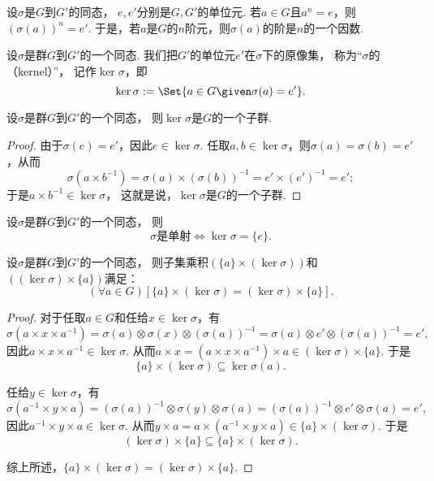 \begin{property}
设\(\sigma\)是\(G\)到\(G'\)的同态，
\(e,e'\)分别是\(G,G'\)的单位元.
若\(a \in G\)且\(a^n = e\)，则\((\sigma(a))^n = e'\).
于是，若\(a\)是\(G\)的\(n\)阶元，则\(\sigma(a)\)的阶是\(n\)的一个因数.
\end{property}

\begin{definition}
设\(\sigma\)是群\(G\)到\(G'\)的一个同态.
我们把\(G'\)的单位元\(e'\)在\(\sigma\)下的原像集，
称为“\(\sigma\)的（kernel）”，
记作\(\ker\sigma\)，即\[
	\ker\sigma \defeq \Set{ a \in G \given \sigma(a) = e' }.
\]
\end{definition}

\begin{proposition}
设\(\sigma\)是群\(G\)到\(G'\)的一个同态，
则\(\ker\sigma\)是\(G\)的一个子群.
\begin{proof}
由于\(\sigma(e)=e'\)，因此\(e\in\ker\sigma\).
任取\(a,b\in\ker\sigma\)，则\(\sigma(a)=\sigma(b)=e'\)，从而\[
	\sigma(a \times b^{-1}) = \sigma(a) \times (\sigma(b))^{-1}
	= e' \times (e')^{-1}
	= e';
\]
于是\(a \times b^{-1} \in \ker\sigma\)，
这就是说，\(\ker\sigma\)是\(G\)的一个子群.
\end{proof}
\end{proposition}

\begin{proposition}
设\(\sigma\)是群\(G\)到\(G'\)的一个同态，
则\[
	\text{\(\sigma\)是单射}
	\iff
	\ker\sigma=\{e\}.
\]
\end{proposition}

\begin{proposition}
设\(\sigma\)是群\(G\)到\(G'\)的一个同态，
则子集乘积\((\{a\}\times(\ker\sigma))\)和\(((\ker\sigma)\times\{a\})\)满足：
\[
	(\forall a \in G)[\{a\}\times(\ker\sigma)=(\ker\sigma)\times\{a\}].
\]
\begin{proof}
对于任取\(a\in G\)和任给\(x\in\ker\sigma\)，有\[
	\sigma(a \times x \times a^{-1})
	= \sigma(a) \otimes \sigma(x) \otimes (\sigma(a))^{-1}
	= \sigma(a) \otimes e' \otimes (\sigma(a))^{-1}
	= e',
\]
因此\(a \times x \times a^{-1} \in \ker\sigma\).
从而\(a \times x
= (a \times x \times a^{-1}) \times a \in (\ker\sigma)\times\{a\}\).
于是\[
	\{a\}\times(\ker\sigma) \subseteq \ker\sigma(a).
\]

任给\(y\in\ker\sigma\)，有\[
	\sigma(a^{-1} \times y \times a)
	= (\sigma(a))^{-1} \otimes \sigma(y) \otimes \sigma(a)
	= (\sigma(a))^{-1} \otimes e' \otimes \sigma(a)
	= e',
\]
因此\(a^{-1} \times y \times a \in \ker\sigma\).
从而\(y \times a = a \times (a^{-1} \times y \times a) \in \{a\}\times(\ker\sigma)\).
于是\[
	(\ker\sigma)\times\{a\} \subseteq \{a\}\times(\ker\sigma).
\]

综上所述，\(\{a\}\times(\ker\sigma)=(\ker\sigma)\times\{a\}\).
\end{proof}
\end{proposition}


